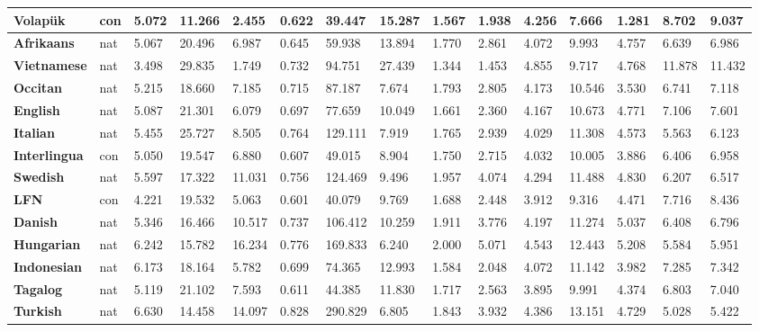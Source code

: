 \documentclass[12pt,a4paper]{article}
\numberwithin{figure}{section}
\numberwithin{table}{section}
\numberwithin{definition}{section}
\begin{document}
\begin{table}[!h]
\begin{adjustbox}{width=\textwidth}
\begin{tabular}{|l|l|l|l|l|l|l|l|l|l|l|l|l|l|l|}
        \textbf{Volapük} & con & 5.072 & 11.266 & 2.455 & 0.622 & 39.447 & 15.287 & 1.567 & 1.938 & 4.256 & 7.666 & 1.281 & 8.702 & 9.037 \\ \hline
        \textbf{Afrikaans} & nat & 5.067 & 20.496 & 6.987 & 0.645 & 59.938 & 13.894 & 1.770 & 2.861 & 4.072 & 9.993 & 4.757 & 6.639 & 6.986 \\ \hline
        \textbf{Vietnamese} & nat & 3.498 & 29.835 & 1.749 & 0.732 & 94.751 & 27.439 & 1.344 & 1.453 & 4.855 & 9.717 & 4.768 & 11.878 & 11.432 \\ \hline
        \textbf{Occitan} & nat & 5.215 & 18.660 & 7.185 & 0.715 & 87.187 & 7.674 & 1.793 & 2.805 & 4.173 & 10.546 & 3.530 & 6.741 & 7.118 \\ \hline
        \textbf{English} & nat & 5.087 & 21.301 & 6.079 & 0.697 & 77.659 & 10.049 & 1.661 & 2.360 & 4.167 & 10.673 & 4.771 & 7.106 & 7.601 \\ \hline
        \textbf{Italian} & nat & 5.455 & 25.727 & 8.505 & 0.764 & 129.111 & 7.919 & 1.765 & 2.939 & 4.029 & 11.308 & 4.573 & 5.563 & 6.123 \\ \hline
        \textbf{Interlingua} & con & 5.050 & 19.547 & 6.880 & 0.607 & 49.015 & 8.904 & 1.750 & 2.715 & 4.032 & 10.005 & 3.886 & 6.406 & 6.958 \\ \hline
        \textbf{Swedish} & nat & 5.597 & 17.322 & 11.031 & 0.756 & 124.469 & 9.496 & 1.957 & 4.074 & 4.294 & 11.488 & 4.830 & 6.207 & 6.517 \\ \hline
        \textbf{LFN} & con & 4.221 & 19.532 & 5.063 & 0.601 & 40.079 & 9.769 & 1.688 & 2.448 & 3.912 & 9.316 & 4.471 & 7.716 & 8.436 \\ \hline
        \textbf{Danish} & nat & 5.346 & 16.466 & 10.517 & 0.737 & 106.412 & 10.259 & 1.911 & 3.776 & 4.197 & 11.274 & 5.037 & 6.408 & 6.796 \\ \hline
        \textbf{Hungarian} & nat & 6.242 & 15.782 & 16.234 & 0.776 & 169.833 & 6.240 & 2.000 & 5.071 & 4.543 & 12.443 & 5.208 & 5.584 & 5.951 \\ \hline
        \textbf{Indonesian} & nat & 6.173 & 18.164 & 5.782 & 0.699 & 74.365 & 12.993 & 1.584 & 2.048 & 4.072 & 11.142 & 3.982 & 7.285 & 7.342 \\ \hline
        \textbf{Tagalog} & nat & 5.119 & 21.102 & 7.593 & 0.611 & 44.385 & 11.830 & 1.717 & 2.563 & 3.895 & 9.991 & 4.374 & 6.803 & 7.040 \\ \hline
        \textbf{Turkish} & nat & 6.630 & 14.458 & 14.097 & 0.828 & 290.829 & 6.805 & 1.843 & 3.932 & 4.386 & 13.151 & 4.729 & 5.028 & 5.422 \\ \hline

\end{tabular}
\end{adjustbox}
\end{table}
\end{document}
